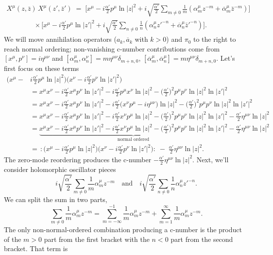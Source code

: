 \begin{tcolorbox}[breakable]
	\begin{multline*}
		X^{\mu}(z,\bar z)\,X^{\mu}(z',\bar z')
		\;=\;
		\Big[x^{\mu}-i\frac{\alpha'}{2} p^{\mu} \ln|z|^2  + i\sqrt{\frac{\alpha'}{2}}\sum_{m\neq0}\frac{1}{m}(\alpha^{\mu}_m z^{-m}+\overline \alpha^{\mu}_m\bar z^{-m})\Big]\\
		\qquad\qquad\times
		\Big[x^{\mu}-i\frac{\alpha'}{2} p^{\mu} \ln|z'|^2  +  i\sqrt{\frac{\alpha'}{2}}\sum_{n\neq0}\frac{1}{n}(\alpha^{\mu}_n z'^{-n}+\overline \alpha^{\mu}_n\bar z'^{-n})\Big].
	\end{multline*}
	We will move annihilation operators ($a_k,\overline a_k$ with $k>0$) and $\pi_0$ to the right to reach normal ordering; non-vanishing c-number contributions come from $[x^{\mu},p^{\nu}]=i\eta^{\mu\nu}$ and $[\alpha^{\mu}_m,\alpha^{\nu}_n]=m\eta^{\mu\nu}\delta_{m+n,0}$, $[\overline \alpha^{\mu}_m,\overline \alpha^{\mu}_n]=m\eta^{\mu \nu}\delta_{m+n,0}$. Let's first focus on these terms
	\begin{align*}
		\Big(x^{\mu}-&i\frac{\alpha'}{2} p^{\mu} \ln|z|^2 \Big)\Big(x^{\nu}-i\frac{\alpha'}{2} p^{\nu} \ln|z'|^2\Big)\\
		&= x^\mu x^\nu
		-i\frac{\alpha'}{2}x^\mu p^\nu \ln|z'|^2
		-i\frac{\alpha'}{2}p^\mu x^\nu \ln|z|^2
		-\Big(\frac{\alpha'}{2}\Big)^2 p^\mu p^\nu \ln|z|^2\ln|z'|^2\\
		&= x^\mu x^\nu
		-i\frac{\alpha'}{2}x^\mu p^\nu \ln|z'|^2
		-i\frac{\alpha'}{2}\big(x^\nu p^\mu - i\eta^{\mu\nu}\big)\ln|z|^2
		-\Big(\frac{\alpha'}{2}\Big)^2 p^\mu p^\nu \ln|z|^2\ln|z'|^2\\
		&= x^\mu x^\nu
		-i\frac{\alpha'}{2}x^\mu p^\nu \ln|z'|^2
		-i\frac{\alpha'}{2}x^\nu p^\mu \ln|z|^2
		-\Big(\frac{\alpha'}{2}\Big)^2 p^\mu p^\nu \ln|z|^2\ln|z'|^2
		-\frac{\alpha'}{2}\eta^{\mu\nu}\ln|z|^2\\
		&=\underbrace{x^\mu x^\nu
			-i\frac{\alpha'}{2}x^\mu p^\nu \ln|z'|^2
			-i\frac{\alpha'}{2}x^\nu p^\mu \ln|z|^2
			-\Big(\frac{\alpha'}{2}\Big)^2 p^\mu p^\nu \ln|z|^2\ln|z'|^2}_{\text{normal ordered}}
		-\frac{\alpha'}{2}\eta^{\mu\nu}\ln|z|^2\\
		&=\,:\!\Big(x^{\mu}-i\frac{\alpha'}{2} p^{\mu} \ln|z|^2 \Big)\Big(x^{\nu}-i\frac{\alpha'}{2} p^{\nu} \ln|z'|^2 \Big)\!:
		\;-\;\frac{\alpha'}{2}\eta^{\mu\nu}\ln|z|^2.
	\end{align*}
	The zero-mode reordering produces the c-number $-\frac{\alpha'}{2}\eta^{\mu\nu}\ln|z|^2$. Next, we'll consider holomorphic oscillator pieces
	$$
	i\sqrt{\frac{\alpha'}{2}}\sum_{m\neq0}\frac{1}{m}\alpha^{\mu}_m z^{-m}
	\quad\text{and}\quad
	i\sqrt{\frac{\alpha'}{2}}\sum_{n\neq0}\frac{1}{n}\alpha^{\mu}_n z'^{-n}.
	$$
	We can split the sum in two parts,
	$$
	\sum_{m\neq0}\frac{1}{m}\alpha^{\mu}_m z^{-m}
	=\sum_{m=-\infty}^{-1}\frac{1}{m}\alpha^{\mu}_m z^{-m}+\sum_{m=1}^{\infty}\frac{1}{m}\alpha^{\mu}_m z^{-m}.
	$$
	The only non-normal-ordered combination producing a c-number is the product of the $m>0$ part from the first bracket with the $n<0$ part from the second bracket. That term is
	

\end{tcolorbox}
